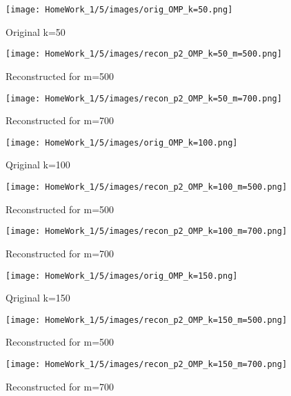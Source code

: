 \documentclass{article}
\begin{document}
\begin{figure}[h!]
    \centering
    \begin{minipage}{0.1\textwidth}
        \texttt{[image: HomeWork\_1/5/images/orig\_OMP\_k=50.png]}
        \caption{Original k=50}
    \end{minipage}
    \hspace{0.5cm}
    \begin{minipage}{0.1\textwidth}
        \centering
        \texttt{[image: HomeWork\_1/5/images/recon\_p2\_OMP\_k=50\_m=500.png]}
        \caption{Reconstructed for m=500}
    \end{minipage}
    \hspace{0.5cm}
    \begin{minipage}{0.1\textwidth}
        \centering
        \texttt{[image: HomeWork\_1/5/images/recon\_p2\_OMP\_k=50\_m=700.png]}
        \caption{Reconstructed for m=700}
    \end{minipage}
\end{figure}

\begin{figure}[h!]
    \centering
    \begin{minipage}{0.1\textwidth}
        \texttt{[image: HomeWork\_1/5/images/orig\_OMP\_k=100.png]}
        \caption{Qriginal k=100}
    \end{minipage}
    \hspace{0.5cm}
    \begin{minipage}{0.1\textwidth}
        \centering
        \texttt{[image: HomeWork\_1/5/images/recon\_p2\_OMP\_k=100\_m=500.png]}
        \caption{Reconstructed for m=500}
    \end{minipage}
    \hspace{0.5cm}
    \begin{minipage}{0.1\textwidth}
        \centering
        \texttt{[image: HomeWork\_1/5/images/recon\_p2\_OMP\_k=100\_m=700.png]}
        \caption{Reconstructed for m=700}
    \end{minipage}
\end{figure}

\begin{figure}[h!]
    \centering
    \begin{minipage}{0.1\textwidth}
        \texttt{[image: HomeWork\_1/5/images/orig\_OMP\_k=150.png]}
        \caption{Qriginal k=150}
    \end{minipage}
    \hspace{0.5cm}
    \begin{minipage}{0.1\textwidth}
        \centering
        \texttt{[image: HomeWork\_1/5/images/recon\_p2\_OMP\_k=150\_m=500.png]}
        \caption{Reconstructed for m=500}
    \end{minipage}
    \hspace{0.5cm}
    \begin{minipage}{0.1\textwidth}
        \centering
        \texttt{[image: HomeWork\_1/5/images/recon\_p2\_OMP\_k=150\_m=700.png]}
        \caption{Reconstructed for m=700}
    \end{minipage}
\end{figure}
\end{document}
